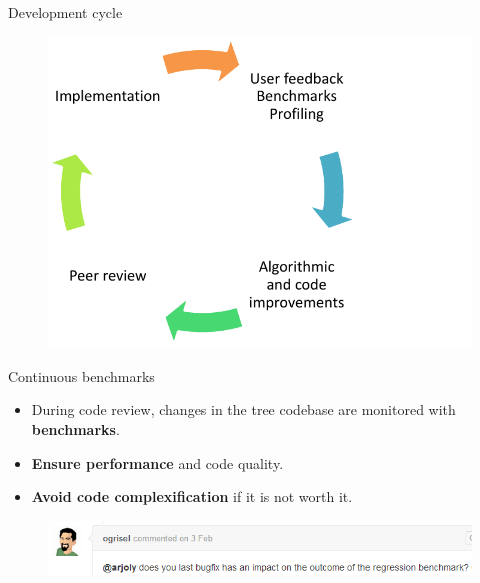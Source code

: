 \documentclass{beamer}
\begin{document}
\begin{frame}{Development cycle}

\vspace{-0.5cm}
\begin{figure}
\hspace*{1.6cm}\includegraphics[scale=0.85]{./figures/iteration.pdf}
\end{figure}



\end{frame}

\begin{frame}{Continuous benchmarks}
\begin{itemize}
\item During code review, changes in the tree codebase are monitored with {\bf benchmarks}.
\item {\bf Ensure performance} and code quality.
\item {\bf Avoid code complexification} if it is not worth it.
\end{itemize}

\begin{figure}
\includegraphics[scale=0.6]{./figures/bench-ogrisel.png}
\end{figure}
\end{frame}
\end{document}
